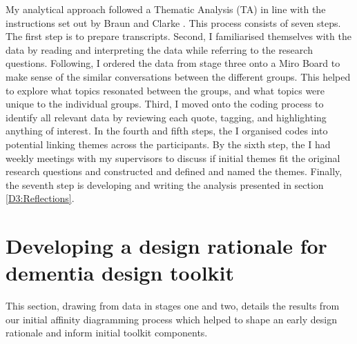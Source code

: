 My analytical approach followed a Thematic Analysis (TA) in line with the instructions set out by Braun and Clarke \citep{braun_using_2006,braun_one_2020}. This process consists of seven steps. The first step is to prepare transcripts. Second,  I familiarised themselves with the data by reading and interpreting the data while referring to the research questions. Following, I ordered the data from stage three onto a Miro Board to make sense of the similar conversations between the different groups. This helped to explore what topics resonated between the groups, and what topics were unique to the individual groups. Third, I moved onto the coding process to identify all relevant data by reviewing each quote, tagging, and highlighting anything of interest. In the fourth and fifth steps, the I organised codes into potential linking themes across the participants. By the sixth step, the I had weekly meetings with my supervisors to discuss if initial themes fit the original research questions and constructed and defined and named the themes. Finally, the seventh step is developing and writing the analysis presented in section \ref{D3:Reflections}.

\section{Developing a design rationale for dementia design toolkit}
\label{D3:Rationale}
This section, drawing from data in stages one and two, details the results from our initial affinity diagramming process which helped to shape an early design rationale and inform initial toolkit components.


